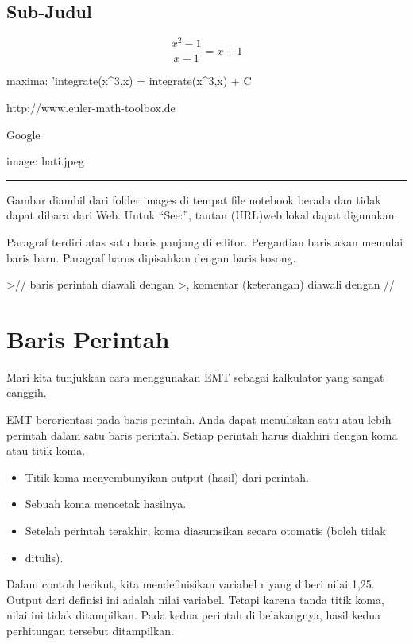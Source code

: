 \documentclass[
]{book}
\begin{document}
\section{Sub-Judul}\label{sub-judul}

\[\frac{x^2-1}{x-1} = x + 1\]

maxima: 'integrate(x\^{}3,x) = integrate(x\^{}3,x) + C

http://www.euler-math-toolbox.de

Google

image: hati.jpeg

\begin{center}\rule{0.5\linewidth}{0.5pt}\end{center}

Gambar diambil dari folder images di tempat file notebook berada dan tidak dapat dibaca dari Web. Untuk ``See:'', tautan (URL)web lokal dapat digunakan.

Paragraf terdiri atas satu baris panjang di editor. Pergantian baris akan memulai baris baru. Paragraf harus dipisahkan dengan baris kosong.

\textgreater// baris perintah diawali dengan \textgreater, komentar (keterangan) diawali dengan //

\chapter{Baris Perintah}\label{baris-perintah}

Mari kita tunjukkan cara menggunakan EMT sebagai kalkulator yang sangat canggih.

EMT berorientasi pada baris perintah. Anda dapat menuliskan satu atau lebih perintah dalam satu baris perintah. Setiap perintah harus diakhiri dengan koma atau titik koma.

\begin{itemize}
\item
  Titik koma menyembunyikan output (hasil) dari perintah.
\item
  Sebuah koma mencetak hasilnya.
\item
  Setelah perintah terakhir, koma diasumsikan secara otomatis (boleh tidak
\item
  ditulis).
\end{itemize}

Dalam contoh berikut, kita mendefinisikan variabel r yang diberi nilai 1,25. Output dari definisi ini adalah nilai variabel. Tetapi karena tanda titik koma, nilai ini tidak ditampilkan. Pada kedua perintah di belakangnya, hasil kedua perhitungan tersebut ditampilkan.
\end{document}
